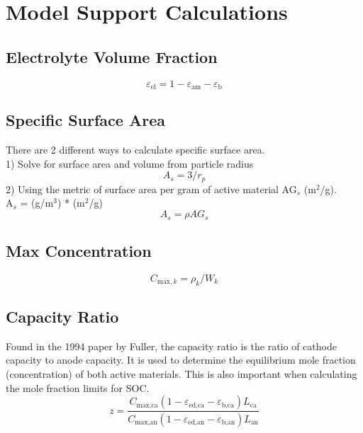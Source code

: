 \documentclass[12pt]{article}
\begin{document}
\section{Model Support Calculations}
\subsection{Electrolyte Volume Fraction}
\begin{equation}
	\varepsilon_\textrm{el} = 1 - \varepsilon_\textrm{am} - \varepsilon_\textrm{b}
\end{equation}
\subsection{Specific Surface Area}
There are 2 different ways to calculate specific surface area.\\
1) Solve for surface area and volume from particle radius
\begin{equation}
	A_s = 3/r_p
\end{equation}
2) Using the metric of surface area per gram of active material AG$_s$ (m$^2$/g).\\
A$_s$ = (g/m$^3$) * (m$^2$/g)
\begin{equation}
	A_s = \rho AG_s
\end{equation}
\subsection{Max Concentration}
\begin{equation}
	C_{\textrm{max},k} = \rho_k / W_k
\end{equation}
\subsection{Capacity Ratio}
Found in the 1994 paper by Fuller\cite{FDN94}, the capacity ratio is the ratio of cathode capacity to anode capacity. It is used to determine the equilibrium mole fraction (concentration) of both active materials. This is also important when calculating the mole fraction limits for SOC.
\begin{equation}
	z = \frac{C_\textrm{max,ca}(1 - \varepsilon_\textrm{ed,ca} - \varepsilon_\textrm{b,ca})L_\textrm{ca}}{C_\textrm{max,an}(1 - \varepsilon_\textrm{ed,an} - \varepsilon_\textrm{b,an})L_\textrm{an}}
\end{equation}
\end{document}
